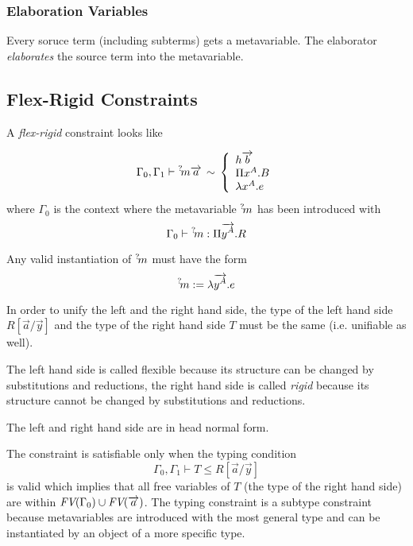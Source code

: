 \subsubsection{Elaboration Variables}

Every soruce term (including subterms) gets a metavariable. The elaborator
\emph{elaborates} the source term into the metavariable.






\subsection{Flex-Rigid Constraints}

A \emph{flex-rigid} constraint looks like

$$
%
    \Gamma_0, \Gamma_1
%
    \vdash
%
    \meta m \vec a
%
    \equiv
%
    \cases {
        h \vec b
        \\
        \Pi x^A. B
        \\
        \lambda x^A. e
    }
$$
%
where $\Gamma_0$ is the context where the metavariable ${{}^? \kern-0.2em m}$ has been
introduced with
$$
    \Gamma_0 \vdash {{}^? \kern-0.2em m} : \Pi {\overrightarrow {y^A}}. R
$$

Any valid instantiation of ${{}^? \kern-0.2em m}$ must have the form
$$
    {{}^? \kern-0.2em m} := \lambda {\overrightarrow {y^A}}. e
$$

In order to unify the left and the right hand side, the type of the left hand
side $R[\vec a/ \vec y]$ and the type of the right hand side $T$ must be the same
(i.e. unifiable as well).

The left hand side is called flexible because its structure can be changed by
substitutions and reductions, the right hand side is called \emph{rigid} because
its structure cannot be changed by substitutions and reductions.

The left and right hand side are in head normal form.


The constraint is satisfiable only when the typing condition
$$
    \Gamma_0, \Gamma_1 \vdash T \le R[\vec a / \vec y]
$$
is valid which implies that all free variables of $T$ (the type of the right
hand side) are within ${\text{\it FV}}(\Gamma_0) \cup {\text{\it FV}}({\overrightarrow {a}})$. The typing constraint is a
subtype constraint because metavariables are introduced with the most general
type and can be instantiated by an object of a more specific type.



